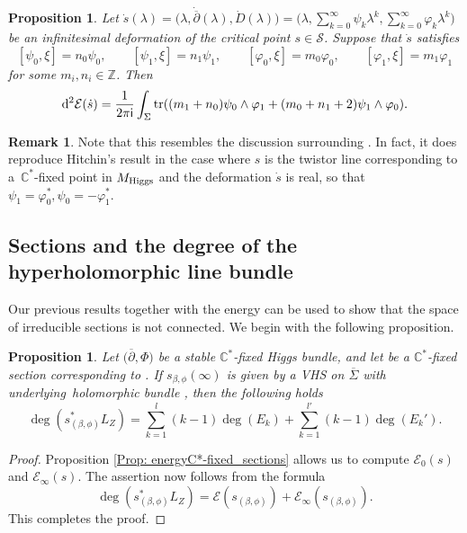 \documentclass[pdftex]{sigma}
\numberwithin{equation}{section}
\newtheorem{Proposition}[Theorem]{Proposition}
\theoremstyle{definition}
\newtheorem{Remark}[Theorem]{Remark}
\newcommand\C{{\mathbb C}}
\renewcommand{\i}{\mathsf{i}}
\begin{document}
\begin{Proposition}
Let $\dot s(\lambda) = \bigl(\lambda, \dot{\overline{\partial}}(\lambda), \dot D(\lambda)\bigr)
 = \bigl(\lambda, \sum_{k=0}^\infty\psi_k\lambda^k, \sum_{k=0}^\infty\varphi_k\lambda^k\bigr)$ be an infinitesimal deformation
of the critical point $s \in \mathcal S$. Suppose that $\dot s$ satisfies
\[ [\psi_0, \xi] = n_0\psi_0,\qquad [\psi_1, \xi] = n_1\psi_1,\qquad [\varphi_0, \xi]
 = m_0\varphi_0,\qquad [\varphi_1, \xi] = m_1\varphi_1\]
for some $m_i, n_i \in \mathbb{Z}$. Then
\[{\rm d}^2\mathcal{E}(\dot s) = \frac{1}{2\pi \i}\int_\Sigma\operatorname{tr}((m_1+n_0)\psi_0\wedge\varphi_1 + (m_0+n_1+2)\psi_1\wedge\varphi_0).\]
\end{Proposition}

\begin{Remark}
Note that this resembles the discussion surrounding \cite[equation (8.10)]{HitchinLie}. In fact, it does reproduce Hitchin's result in the
case where $s$ is the twistor line corresponding to a~$\C^*$-fixed point in $\mathcal \mathcal{M}_{\mathrm{Higgs}} $
and the deformation $\dot s$ is real, so that $\psi_1 = \varphi_0^*, \psi_0 = -\varphi_1^*$.
\end{Remark}

\subsection{Sections and the degree of the hyperholomorphic line bundle}
Our previous results together with the energy can be used to show that the space of irreducible sections is not connected.
We begin with the following proposition.

\begin{Proposition}\label{Prop: deghyperhol_C*fixedsection}
Let $\bigl({\overline{\partial}}, \Phi\bigr)$ be a stable $\C^*$-fixed Higgs bundle, and let
 be a $\C^*$-fixed section corresponding to .
If $s_{\beta,\phi}(\infty)$ is given by a VHS on $\overline{\Sigma}$ with under\-lying~holomorphic bundle , then the following holds
\[
\deg(s_{(\beta,\phi)}^*L_Z) = \sum_{k=1}^l(k-1)\deg(E_k) + \sum_{k=1}^{l'}(k-1)\deg(E_k').
\]
\end{Proposition}

\begin{proof}
Proposition \ref{Prop: energyC*-fixed_sections} allows us to compute $\mathcal E_0(s)$ and $\mathcal E_\infty(s)$.
The assertion now follows from the formula
\[\deg(s_{(\beta,\phi)}^*L_Z) = \mathcal E(s_{(\beta,\phi)})+\mathcal E_\infty(s_{(\beta,\phi)}).\]
This completes the proof.
\end{proof}
\end{document}
